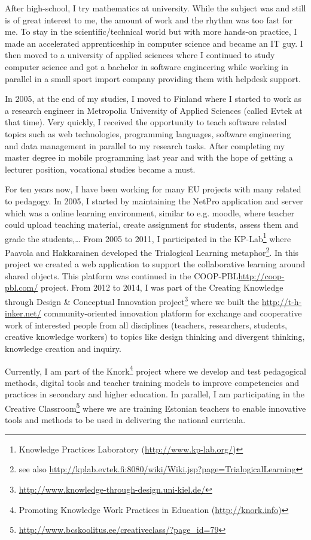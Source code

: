 After high-school, I try mathematics at university. While the subject was and still is of great interest to me, the amount of work and the rhythm was too fast for me. 
To stay in the scientific/technical world but with more hands-on practice, I made an accelerated apprenticeship in computer science and became an IT guy. 
I then moved to a university of applied sciences where I continued to study computer science and got a bachelor in software engineering while working in parallel in a small sport import company providing them with helpdesk support.

In 2005, at the end of my studies, I moved to Finland where I started to work as a research engineer in Metropolia University of Applied Sciences (called Evtek at that time). 
Very quickly, I received the opportunity to teach software related topics such as web technologies, programming languages, software engineering and data management in parallel to my research tasks. 
After completing my master degree in mobile programming last year and with the hope of getting a lecturer position, vocational studies became a must.

For ten years now, I have been working for many EU projects with many related to pedagogy. 
In 2005, I started by maintaining the NetPro application and server which was a online learning environment, similar to e.g. moodle, where teacher could upload teaching material, create assignment for students, assess them and grade the students,\ldots
From 2005 to 2011, I participated in the KP-Lab\footnote{Knowledge Practices Laboratory (\url{http://www.kp-lab.org/})} where Paavola and Hakkarainen \cite{Paavola_2005} developed the Trialogical Learning metaphor\footnote{see also \url{http://kplab.evtek.fi:8080/wiki/Wiki.jsp?page=TrialogicalLearning}}. In this project we created a web application to support the collaborative learning around shared objects.
This platform was continued in the COOP-PBL\url{http://coop-pbl.com/} project.
From 2012 to 2014, I was part of the Creating Knowledge through Design & Conceptual Innovation project\footnote{\url{http://www.knowledge-through-design.uni-kiel.de/}} where we built the \url{http://t-h-inker.net/} community-oriented innovation platform for exchange and cooperative work of interested people from all disciplines (teachers, researchers, students, creative knowledge workers) to topics like design thinking and divergent thinking, knowledge creation and inquiry. 

Currently, I am part of the Knork\footnote{Promoting Knowledge Work Practices in Education (\url{http://knork.info})} project where we develop and test pedagogical methods, digital tools and teacher training models to improve competencies and practices in secondary and higher education. In parallel, I am participating in the Creative Classroom\footnote{\url{http://www.bcskoolitus.ee/creativeclass/?page_id=79}} where we are training Estonian teachers  to enable innovative tools and methods to be used in delivering the national curricula.






  
  
  
  